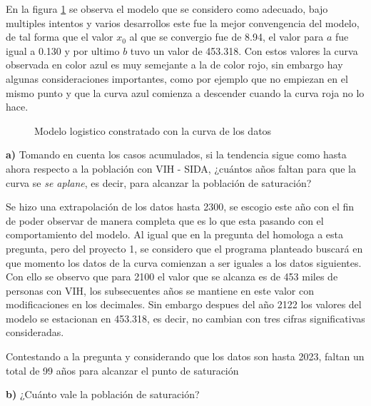 \documentclass{article}
\begin{document}
\vspace{10pt}



En la figura \ref{f5} se observa el modelo que se considero como adecuado, bajo multiples intentos y varios desarrollos este fue la mejor convengencia del modelo, de tal forma que el valor $x_0$ al que se convergio fue de 8.94, el valor para $a$ fue igual a 0.130 y por ultimo $b$ tuvo un valor de 453.318. Con estos valores la curva observada en color azul es muy semejante a la de color rojo, sin embargo hay algunas consideraciones importantes, como por ejemplo que no empiezan en el mismo punto y que la curva azul comienza a descender cuando la curva roja no lo hace.   


\begin{figure}[h!]
    \centering
    \scalebox{0.7}{}
    \caption{Modelo logistico constratado con la curva de los datos}
    \label{f5}
\end{figure}


\textbf{a)} Tomando en cuenta los casos acumulados, si la tendencia sigue como hasta ahora respecto a la población con VIH - SIDA, ¿cuántos años faltan para que la curva se \textit{se aplane}, es decir, para alcanzar la población de saturación?

\vspace{10pt}


Se hizo una extrapolación de los datos hasta 2300, se escogio este año con el fin de poder observar de manera completa que es lo que esta pasando con el comportamiento del modelo. Al igual que en la pregunta del homologa a esta pregunta, pero del proyecto 1, se considero que el programa planteado buscará en que momento los datos de la curva comienzan a ser iguales a los datos siguientes. Con ello se observo que para 2100 el valor que se alcanza es de 453 miles de personas con VIH, los subsecuentes años se mantiene en este valor con modificaciones en los decimales. Sin embargo despues del año 2122 los valores del modelo se estacionan en 453.318, es decir, no cambian con tres cifras significativas consideradas. 

\vspace{10pt}


Contestando a la pregunta y considerando que los datos son hasta 2023, faltan un total de 99 años para alcanzar el punto de saturación

\vspace{10pt}


\textbf{b)} ¿Cuánto vale la población de saturación?
\end{document}
